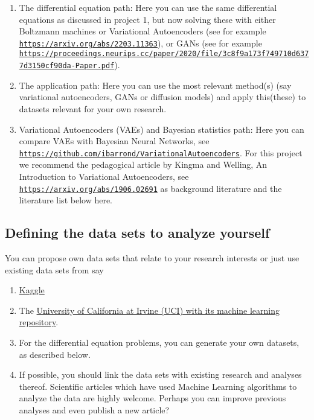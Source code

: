 \documentclass[%
oneside,                 %
final,                   %
10pt]{article}
\begin{document}
\begin{enumerate}
\item The differential equation path: Here you can use the same differential equations as discussed in project 1, but now solving these with either Boltzmann machines or Variational Autoencoders (see for example \href{{https://arxiv.org/abs/2203.11363}}{\nolinkurl{https://arxiv.org/abs/2203.11363}}), or GANs (see for example \href{{https://proceedings.neurips.cc/paper/2020/file/3c8f9a173f749710d6377d3150cf90da-Paper.pdf}}{\nolinkurl{https://proceedings.neurips.cc/paper/2020/file/3c8f9a173f749710d6377d3150cf90da-Paper.pdf}}).  

\item The application path: Here you can use the most relevant method(s) (say variational autoencoders, GANs or diffusion models) and apply this(these) to datasets relevant for your own research.

\item Variational Autoencoders (VAEs) and Bayesian statistics path: Here you can compare VAEs with Bayesian Neural Networks, see \href{{https://github.com/ibarrond/VariationalAutoencoders}}{\nolinkurl{https://github.com/ibarrond/VariationalAutoencoders}}. For this project we recommend the pedagogical article by Kingma and Welling, An Introduction to Variational Autoencoders, see \href{{https://arxiv.org/abs/1906.02691}}{\nolinkurl{https://arxiv.org/abs/1906.02691}} as background literature and the literature list below here.
\end{enumerate}

\noindent
\subsection*{Defining the data sets to analyze yourself}

You can propose own data sets that relate to your research interests or just use existing data sets from say
\begin{enumerate}
\item \href{{https://www.kaggle.com/datasets}}{Kaggle} 

\item The \href{{https://archive.ics.uci.edu/ml/index.php}}{University of California at Irvine (UCI) with its  machine learning repository}.

\item For the differential equation problems, you can generate your own datasets, as described below.

\item If possible, you should link the data sets with existing research and analyses thereof. Scientific articles which have used Machine Learning algorithms to analyze the data are highly welcome. Perhaps you can improve previous analyses and even publish a new article? 
\end{enumerate}
\end{document}
